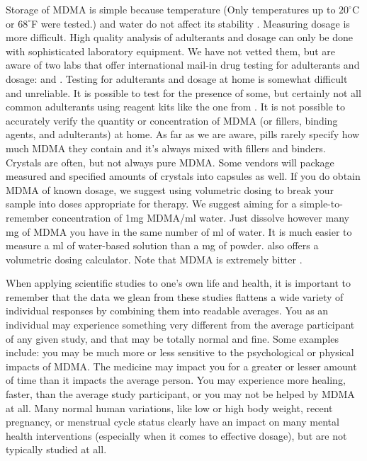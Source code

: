 \documentclass[12pt,letterpaper]{book}
\begin{document}
Storage of MDMA is simple because temperature (Only temperatures up to $20^{\circ}$C or $68^{\circ}$F were tested.) and water do not affect its stability \cite{clauwaertStability}. Measuring dosage is more difficult. High quality analysis of adulterants and dosage can only be done with sophisticated laboratory equipment. We have not vetted them, but are aware of two labs that offer international mail-in drug testing for adulterants and dosage: \textcite{kykeonTesting} and \textcite{energyTesting}. Testing for adulterants and dosage at home is somewhat difficult and unreliable. It is possible to test for the presence of some, but certainly not all common adulterants using reagent kits like the one from \textcite{danceSafeTestingKit} \cite{reagentInstructions}. It is not possible to accurately verify the quantity or concentration of MDMA (or fillers, binding agents, and adulterants) at home. As far as we are aware, pills rarely specify how much MDMA they contain and it's always mixed with fillers and binders. Crystals are often, but not always pure MDMA. Some vendors will package measured and specified amounts of crystals into capsules as well. If you do obtain MDMA of known dosage, we suggest using volumetric dosing to break your sample into doses appropriate for therapy. We suggest aiming for a simple-to-remember concentration of 1mg MDMA/ml water. Just dissolve however many mg of MDMA you have in the same number of ml of water. It is much easier to measure a ml of water-based solution than a mg of powder. \textcite{volumetricDilution} also offers a volumetric dosing calculator. Note that MDMA is extremely bitter \cite{milivcevic2020bitter}.

When applying scientific studies to one's own life and health, it is important to remember that the data we glean from these studies flattens a wide variety of individual responses by combining them into readable averages. You as an individual may experience something very different from the average participant of any given study, and that may be totally normal and fine. Some examples include: you may be much more or less sensitive to the psychological or physical impacts of MDMA. The medicine may impact you for a greater or lesser amount of time than it impacts the average person. You may experience more healing, faster, than the average study participant, or you may not be helped by MDMA at all. Many normal human variations, like low or high body weight, recent pregnancy, or menstrual cycle status clearly have an impact on many mental health interventions (especially when it comes to effective dosage), but are not typically studied at all.
\end{document}
